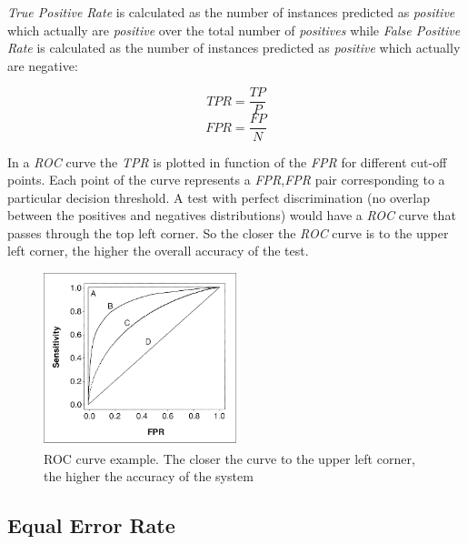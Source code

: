 \textit{True Positive Rate} is calculated as the number of instances predicted
as \textit{positive} which
actually are \textit{positive} over the total number of \textit{positives} while
\textit{False Positive Rate} is calculated as the number of instances predicted as
\textit{positive} which actually are negative:

\begin{multicols}{2}
  \noindent
  \begin{equation}
    \label{eq:tpr}
    TPR = \frac{TP}{P}
  \end{equation}
  \begin{equation}
    \label{eq:fpr}
    FPR = \frac{FP}{N}
  \end{equation}
\end{multicols}

In a \textit{ROC} curve the \textit{TPR} is plotted in function of the \textit{FPR} for
different cut-off points. Each point of the curve represents a {\textit{FPR},\textit{FPR}}
pair corresponding to a particular decision threshold. A test with perfect discrimination
(no overlap between the positives and negatives distributions) would have a \textit{ROC}
curve that passes through the top left corner. So the closer the \textit{ROC} curve is to
the upper left corner, the higher the overall accuracy of the test.

\begin{figure}[H]
  \centering
  \includegraphics[width=0.5\textwidth]{files/figures/method/roc-curve}
  \caption{ROC curve example. The closer the curve to the upper left corner, the higher the
  accuracy of the system}
  \label{fig:rocCurve}
\end{figure}

\subsection{Equal Error Rate}

